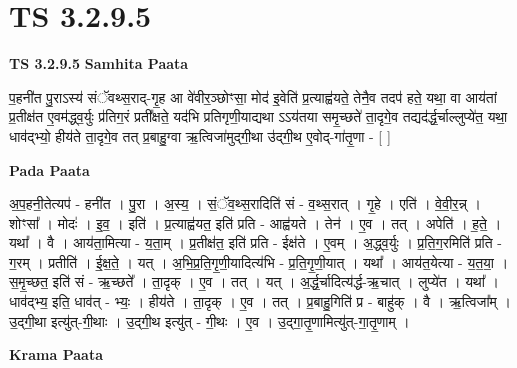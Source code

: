 \documentclass[17pt]{extarticle}
\begin{document}

\section{ TS 3.2.9.5 }

\textbf{TS 3.2.9.5 } \newline
\textbf{Samhita Paata} \newline

प॒हनी॑त पु॒राऽस्य॑ संॅवथ्स॒राद्-गृ॒ह आ वे॑वीर॒ञ्छोꣳसा॒ मोद॑ इ॒वेति॑ प्र॒त्याह्व॑यते॒ तेनै॒व तदप॑ हते॒ यथा॒ वा आय॑तां प्र॒तीक्ष॑त ए॒वम॑द्ध्व॒र्युः प्र॑तिग॒रं प्रती᳚क्षते॒ यद॑भि प्रतिगृणी॒याद्यथा ऽऽय॑तया समृ॒च्छते॑ ता॒दृगे॒व तद्यद॑र्द्ध॒र्चाल्लुप्ये॑त॒ यथा॒ धाव॑द्भ्यो॒ हीय॑ते ता॒दृगे॒व तत् प्र॒बाहु॒ग्वा ऋ॒त्विजा॑मुद्गी॒था उ॑द्गी॒थ ए॒वोद्-गा॑तृ॒णा - [  ] \newline

\textbf{Pada Paata} \newline

अ॒प॒हनी॒तेत्यप॑ - हनी॑त । पु॒रा । अ॒स्य॒ । सं॒ॅव॒थ्स॒रादिति॑ सं - व॒थ्स॒रात् । गृ॒हे । एति॑ । वे॒वी॒र॒न्न् । शोꣳसा᳚ । मोदः॑ । इ॒व॒ । इति॑ । प्र॒त्याह्व॑यत॒ इति॑ प्रति - आह्व॑यते । तेन॑ । ए॒व । तत् । अपेति॑ । ह॒ते॒ । यथा᳚ । वै । आय॑ता॒मित्या - य॒ता॒म् । प्र॒तीक्ष॑त॒ इति॑ प्रति - ईक्ष॑ते । ए॒वम् । अ॒द्ध्व॒र्युः । प्र॒ति॒ग॒रमिति॑ प्रति - ग॒रम् । प्रतीति॑ । ई॒क्ष॒ते॒ । यत् । अ॒भि॒प्र॒ति॒गृ॒णी॒यादित्य॑भि - प्र॒ति॒गृ॒णी॒यात् । यथा᳚ । आय॑त॒येत्या - य॒त॒या॒ । स॒मृ॒च्छत॒ इति॑ सं - ऋ॒च्छते᳚ । ता॒दृक् । ए॒व । तत् । यत् । अ॒र्द्ध॒र्चादित्य॑र्द्ध-ऋ॒चात् । लुप्ये॑त । यथा᳚ । धाव॑द्भ्य॒ इति॒ धाव॑त् - भ्यः॒ । हीय॑ते । ता॒दृक् । ए॒व । तत् । प्र॒बाहु॒गिति॑ प्र - बाहु॑क् । वै । ऋ॒त्विजा᳚म् । उ॒द्गी॒था इत्यु॑त्-गी॒थाः । उ॒द्गी॒थ इत्यु॑त् - गी॒थः । ए॒व । उ॒द्गा॒तृ॒णामित्यु॑त्-गा॒तृ॒णाम् ।  \newline


\textbf{Krama Paata} \newline
\end{document}
